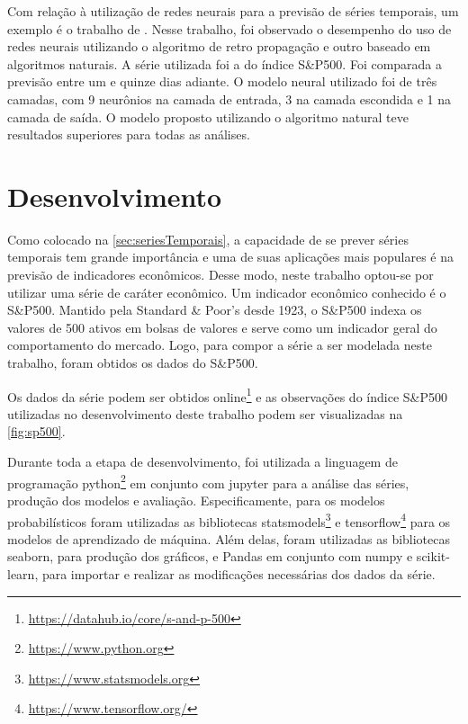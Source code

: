 \documentclass[
    12pt,
    oneside,
    a4paper,
    english,
    brazil
]{abntex2}
\begin{document}
Com relação à  utilização  de  redes   neurais para a previsão de séries temporais, um exemplo é o trabalho de .
Nesse  trabalho, foi  observado o  desempenho do  uso de
redes neurais  utilizando o algoritmo de  retro propagação e outro  baseado em
algoritmos naturais. A série utilizada foi a do índice S\&P500. Foi comparada
a previsão  entre um e  quinze dias adiante. O  modelo neural utilizado  foi de
três camadas, com 9  neurônios na camada de entrada, 3 na  camada escondida e 1
na camada de saída.  O modelo proposto utilizando o algoritmo  natural teve resultados
superiores para todas as análises.

\chapter{Desenvolvimento}\label{chap:desenv}

Como  colocado  na \autoref{sec:seriesTemporais},  a  capacidade  de se  prever
séries temporais tem grande importância e uma de suas aplicações mais populares
é na  previsão de  indicadores  econômicos. Desse modo, neste trabalho optou-se por utilizar uma série de caráter econômico.
Um indicador econômico conhecido é o S\&P500. 
Mantido  pela Standard \&  Poor's desde 1923, o S\&P500 indexa os valores de  
500 ativos em  bolsas de valores e  serve como  um indicador  geral do  comportamento do  mercado. 
Logo, para compor a série a ser modelada neste trabalho, foram  obtidos os dados do S\&P500.

Os           dados            da           série            podem           ser
obtidos      online\footnote{\url{https://datahub.io/core/s-and-p-500}} e as observações do índice  S\&P500 utilizadas no desenvolvimento deste trabalho podem ser visualizadas na
\autoref{fig:sp500}.

Durante  toda  a  etapa  de  desenvolvimento,  foi  utilizada  a  linguagem  de
programação   python\footnote{\url{https://www.python.org}}  em   conjunto  com
jupyter  para  a  análise  das   séries,  produção  dos  modelos  e  avaliação.
Especificamente,   para    os   modelos   probabilísticos    foram   utilizadas
as    bibliotecas   statsmodels\footnote{\url{https://www.statsmodels.org}}    e
tensorflow\footnote{\url{https://www.tensorflow.org/}}   para  os   modelos  de
aprendizado de  máquina. Além delas,  foram utilizadas as  bibliotecas seaborn,
para produção dos gráficos, e Pandas em conjunto com numpy e scikit-learn, para
importar e realizar as modificações necessárias dos dados da série.
\end{document}
